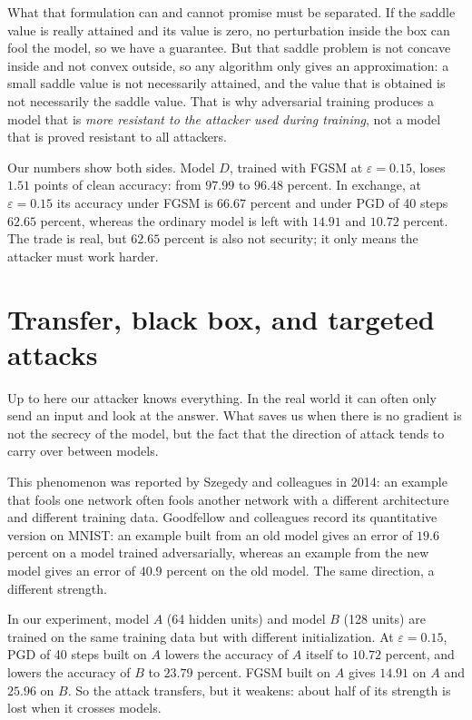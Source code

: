 What that formulation can and cannot promise must be separated. If the saddle value
is really attained and its value is zero, no perturbation inside the box can fool the
model, so we have a guarantee. But that saddle problem is not concave inside and not
convex outside, so any algorithm only gives an approximation: a small saddle value is
not necessarily attained, and the value that is obtained is not necessarily the
saddle value. That is why adversarial training produces a model that is \emph{more
resistant to the attacker used during training}, not a model that is proved resistant
to all attackers.

Our numbers show both sides. Model $D$, trained with FGSM at
$\varepsilon=0.15$, loses $1.51$ points of clean accuracy: from $97.99$ to
$96.48$ percent. In exchange, at $\varepsilon=0.15$ its accuracy under
FGSM is $66.67$ percent and under PGD of 40 steps $62.65$ percent, whereas
the ordinary model is left with $14.91$ and $10.72$ percent. The trade is real, but
$62.65$ percent is also not security; it only means the attacker must work
harder.

\section{Transfer, black box, and targeted attacks}

Up to here our attacker knows everything. In the real world it can often only send
an input and look at the answer. What saves us when there is no gradient is not the
secrecy of the model, but the fact that the direction of attack tends to carry over
between models.


This phenomenon was reported by Szegedy and colleagues in 2014: an example that fools
one network often fools another network with a different architecture and different
training data. Goodfellow and colleagues record its quantitative version on MNIST: an
example built from an old model gives an error of $19.6$ percent on a model trained
adversarially, whereas an example from the new model gives an error of $40.9$ percent
on the old model. The same direction, a different strength.

In our experiment, model $A$ (64 hidden units) and model $B$ (128 units) are trained
on the same training data but with different initialization. At
$\varepsilon=0.15$, PGD of 40 steps built on $A$ lowers the accuracy of $A$ itself to
$10.72$ percent, and lowers the accuracy of $B$ to $23.79$ percent. FGSM built on
$A$ gives $14.91$ on $A$ and $25.96$ on $B$. So the attack transfers, but
it weakens: about half of its strength is lost when it crosses models.

